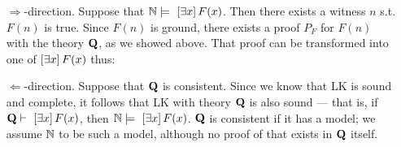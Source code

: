 \begin{itemize}
	\item[$\Rightarrow$-direction.] Suppose that $\modelsS{\N}{\exQ{x} F(x)}$. Then there exists a witness $n$ s.t. $F(n)$ is true. Since $F(n)$ is ground, there exists a proof $P_F$ for $F(n)$ with the theory $\bQ$, as we showed above. That proof can be transformed into one of $\exQ{x} F(x)$ thus:
	
	\begin{prooftree}
	\end{prooftree}
	
	\item[$\Leftarrow$-direction.] Suppose that $\bQ$ is consistent. Since we know that LK is sound and complete, it follows that LK with theory $\bQ$ is also sound --- that is, if $\proves{\bQ}{\exQ{x} F(x)}$, then $\modelsS{\N}{\exQ{x} F(x)}$. $\bQ$ is consistent if it has a model; we assume $\N$ to be such a model, although no proof of that exists in $\bQ$ itself.
\end{itemize}


